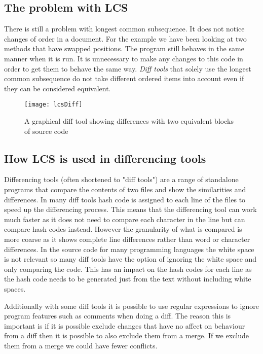 \subsection{The problem with LCS}
There is still a problem with longest common subsequence. It does not notice changes of order in a document.  For the example we have been looking at two methods that have swapped positions.  The program still behaves in the same manner when it is run.  It is unnecessary to make any changes to this code in order to get them to behave the same way. \emph{Diff tools} that solely use the longest common subsequence do not take different ordered items into account even if they can be considered equivalent.

\begin{figure}[h]
\begin{center}
\texttt{[image: lcsDiff]}
\end{center}
 \caption{A graphical diff tool showing differences with two equivalent blocks of source code}
\end{figure}

\subsection{How LCS is used in differencing tools}
Differencing tools (often shortened to "diff tools") are a range of standalone programs that compare the contents of two files and show the similarities and differences.
In many diff tools hash code is assigned to each line of the files to speed up the differencing process.
This means that the differencing tool can work much faster as it does not need to compare each character in the line but can compare hash codes instead.
However the granularity of what is compared is more coarse as it shows complete line differences rather than word or character differences. 
In the source code for many programming languages the white space is not relevant so many diff tools have the option of ignoring the white space and only comparing the code.
This has an impact on the hash codes for each line as the hash code needs to be generated just from the text without including white spaces.

Additionally with some diff tools it is possible to use regular expressions to ignore program features such as comments when doing a diff.  The reason this is important is if it is possible exclude changes that have no affect on behaviour from a diff then it is possible to also exclude them from a merge.  If we exclude them from a merge we could have fewer conflicts.

